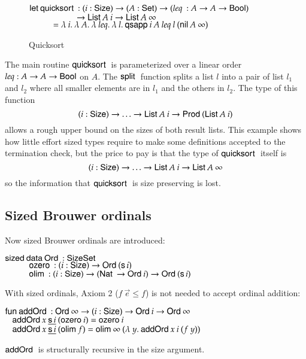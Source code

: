 \begin{figure}[htp]
{\begin{minipage}{0.8\textwidth}
\begin{bsp}
$\mathsf{let}\: \mathsf{quicksort}\: : (i : \mathsf{Size} ) \rightarrow (A : \mathsf{Set} ) \rightarrow (\mathit{leq}\: : A \rightarrow A \rightarrow \mathsf{Bool})$\\ 
$\spcx \spcx \ra \SList A\: i \ra \SList A\: \infty$\\
$\spcx = \lam{i}\lam{A}\lam{leq}\lam{l} \qsapp i\: A\: leq \: l \: (\nil A\: \infty)$ 
\end{bsp}
\end{minipage}
}
\caption{Quicksort}
\label{fsort}
\end{figure}

The main routine $\mathsf{quicksort}\:$ is parameterized over a linear order $leq : A \rightarrow A \rightarrow \mathsf{Bool}$ on $A$.
The $\mathsf{split}\:$ function splits a list $l$ into a pair of list $l_1$ and $l_2$ where all smaller elements are in $l_1$ and the others in $l_2$.
The type of this function  
\[ (i : \mathsf{Size} ) \rightarrow \ldots \rightarrow \mathsf{List}\: A \: i \rightarrow \mathsf{Prod}\: (\mathsf{List}\: A \: i) \]
\noindent allows a rough upper bound on the sizes of both result lists.
This example shows how little effort sized types require to make some definitions accepted
to the termination check, but the price to pay is that the type of $\mathsf{quicksort}\:$ itself is 
\[ (i : \mathsf{Size} ) \rightarrow \ldots \rightarrow \mathsf{List}\: A\: i \rightarrow \mathsf{List}\: A\: \infty \]
\noindent so the information that $\mathsf{quicksort}\:$ is size preserving is lost.

\subsection{Sized Brouwer ordinals}
Now sized Brouwer ordinals are introduced:
\begin{bsp}
$\mathsf{sized}\: \mathsf{data}\: \mathsf{Ord}\: : \mathsf{Size} \mathsf{Set}$ \\
$\spcx \ozero : (i : \Size ) \ra \SOrd (\s i) $\\
$\spcx \olim : ( i : \Size ) \ra (\Nat \ra \SOrd i) \ra \SOrd (\s i) $
\end{bsp}
With sized ordinals, Axiom 2 ($f \: \vec{e} \leq f$) is not needed to accept ordinal addition:
\begin{bsp}
$\mathsf{fun}\: \mathsf{addOrd}\: : \mathsf{Ord}\: \infty \rightarrow ( i : \mathsf{Size} ) \rightarrow{\mathsf{Ord}\:i \rightarrow\mathsf{Ord}\:\infty }$\\
$\hspace*{3mm} \mathsf{addOrd}\: x\: \underline{\mathsf{s}\, i}\: (\mathsf{ozero}\: i) = \mathsf{ozero}\: i $\\
$\hspace*{3mm} \mathsf{addOrd}\: x\: \underline{\mathsf{s}\, i}\: (\mathsf{olim}\: f)  = \mathsf{olim}\: \infty \: ( \lambda\: y .\: \mathsf{addOrd}\:  x \: i \: (f \: y))  $
\end{bsp}
$\mathsf{addOrd}\:$ is structurally recursive in the size argument.
